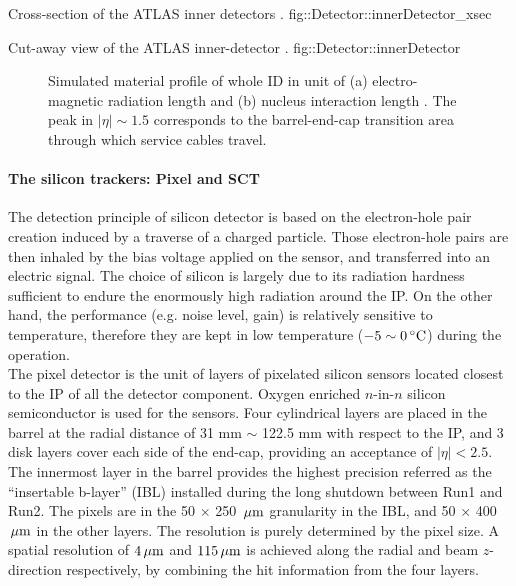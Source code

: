 {Cross-section of the ATLAS inner detectors \cite{ATLAS_exp}.}
{fig::Detector::innerDetector_xsec}


{Cut-away view of the ATLAS inner-detector \cite{ATLAS_exp}.}
{fig::Detector::innerDetector}

\begin{figure}
  \centering
    \caption{ Simulated material profile of whole ID in unit of (a) electro-magnetic radiation length and (b) nucleus interaction length \cite{ATLAS_exp}.
      The peak in $|\eta|\sim 1.5$ corresponds to the barrel-end-cap transition area through which service cables travel.
      \label{fig::Detector::IDmaterial} }
\end{figure}



\paragraph{The silicon trackers: Pixel and SCT} 
The detection principle of silicon detector is based on the electron-hole pair creation induced by a traverse of a charged particle.
Those electron-hole pairs are then inhaled by the bias voltage applied on the sensor, and transferred into an electric signal. 
The choice of silicon is largely due to its radiation hardness sufficient to endure the enormously high radiation around the IP. 
On the other hand, the performance (e.g. noise level, gain) is relatively sensitive to temperature, therefore they are kept in low temperature ($-5 \sim 0\, {}^\circ\mathrm{C}$) during the operation.  \\

The pixel detector is the unit of layers of pixelated silicon sensors located closest to the IP of all the detector component. 
Oxygen enriched $n$-in-$n$ silicon semiconductor is used for the sensors.
Four cylindrical layers are placed in the barrel at the radial distance of 31 mm $\sim$ 122.5 mm with respect to the IP, 
and 3 disk layers cover each side of the end-cap, providing an acceptance of $|\eta|<2.5$. 
The innermost layer in the barrel provides the highest precision referred as the ``insertable b-layer'' (IBL) installed during the long shutdown between Run1 and Run2.
The pixels are in the 50 $\times$ 250 $\, \mathrm{\mu m}$ granularity in the IBL, and 50 $\times$ 400 $\, \mathrm{\mu m}$ in the other layers. 
The resolution is purely determined by the pixel size. 
A spatial resolution of $4\, \mathrm{\mu m}$ and $115\, \mathrm{\mu m}$ is achieved along the radial and beam $z$-direction respectively, 
by combining the hit information from the four layers. \\

